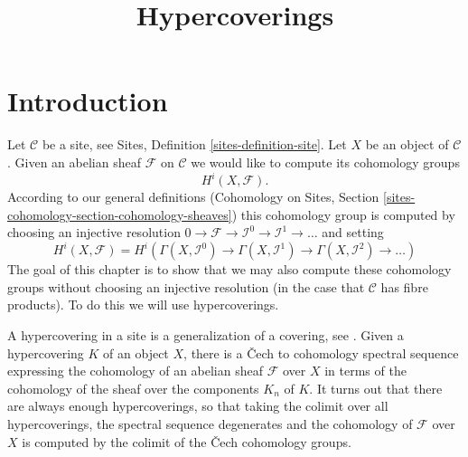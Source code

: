 

%


\title{Hypercoverings}


\maketitle

\label{section-phantom}

\tableofcontents

\section{Introduction}
\label{section-introduction}

\noindent
Let $\mathcal{C}$ be a site, see Sites, Definition \ref{sites-definition-site}.
Let $X$ be an object of $\mathcal{C}$.
Given an abelian sheaf $\mathcal{F}$
on $\mathcal{C}$ we would like to compute
its cohomology groups
$$
H^i(X, \mathcal{F}).
$$
According to our general definitions (Cohomology on Sites, Section
\ref{sites-cohomology-section-cohomology-sheaves})
this cohomology group is computed by
choosing an injective resolution
$
0 \to \mathcal{F} \to \mathcal{I}^0 \to \mathcal{I}^1 \to \ldots
$
and setting
$$
H^i(X, \mathcal{F})
=
H^i(
\Gamma(X, \mathcal{I}^0) \to
\Gamma(X, \mathcal{I}^1) \to
\Gamma(X, \mathcal{I}^2)\to \ldots)
$$
The goal of this chapter is to show that we may also compute these
cohomology groups without choosing an injective resolution
(in the case that $\mathcal{C}$ has fibre products). To do this
we will use hypercoverings.

\medskip\noindent
A hypercovering in a site is a generalization of a covering, see
\cite[Expos\'e V, Sec. 7]{SGA4}. Given a hypercovering $K$ of an object
$X$, there is a {\v C}ech to cohomology spectral sequence
expressing the cohomology of an abelian sheaf $\mathcal{F}$
over $X$ in terms of the cohomology of the sheaf over the
components $K_n$ of $K$. It turns out that there are always
enough hypercoverings, so that taking the colimit over all hypercoverings,
the spectral sequence degenerates and the cohomology of $\mathcal{F}$
over $X$ is computed by the colimit of the {\v C}ech cohomology groups.

